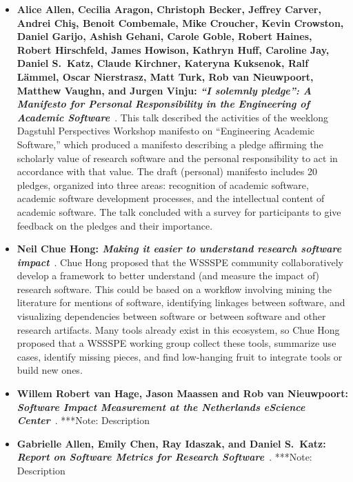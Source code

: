 \documentclass[11pt, oneside]{amsart}
\newcommand{\note}[1]{ {\textcolor{blueish}    { ***Note:      #1 }}}
\begin{document}
\begin{itemize}[itemsep=1ex]
    \item \textbf{Alice Allen, Cecilia Aragon, Christoph Becker, Jeffrey Carver,
    Andrei Chi\c{s}, Benoit Combemale, Mike Croucher, Kevin Crowston, Daniel Garijo,
    Ashish Gehani, Carole Goble\textsuperscript{\textasteriskcentered},
    Robert Haines, Robert Hirschfeld, James Howison,
    Kathryn Huff, Caroline Jay, Daniel S.~Katz, Claude Kirchner, Kateryna Kuksenok,
    Ralf L\"{a}mmel, Oscar Nierstrasz, Matt Turk, Rob van Nieuwpoort, Matthew Vaughn,
    and Jurgen Vinju: \emph{``I solemnly pledge'': A Manifesto for Personal
    Responsibility in the Engineering of Academic Software}}~\cite{AAllen:2016ws}.
    This talk described the activities of the weeklong Dagstuhl Perspectives Workshop
    manifesto on ``Engineering Academic Software,'' which produced a manifesto
    describing a pledge affirming the scholarly value of research software and
    the personal responsibility to act in accordance with that value. The draft
    (personal) manifesto includes 20 pledges, organized into three areas:
    recognition of academic software, academic software development processes,
    and the intellectual content of academic software. The talk concluded with a
    survey for participants to give feedback on the pledges and their importance.

    \item \textbf{Neil Chue Hong\textsuperscript{\textasteriskcentered}:
    \textit{Making it easier to understand research software impact}}~\cite{ChueHong:2016wsb}.
    Chue Hong proposed that the WSSSPE community collaboratively develop a framework
    to better understand (and measure the impact of) research software. This could
    be based on a workflow involving mining the literature for mentions of software,
    identifying linkages between software, and visualizing dependencies between
    software or between software and other research artifacts. Many tools already
    exist in this ecosystem, so Chue Hong proposed that a WSSSPE working group
    collect these tools, summarize use cases, identify missing pieces, and find
    low-hanging fruit to integrate tools or build new ones.

    \item \textbf{Willem Robert van Hage\textsuperscript{\textasteriskcentered},
    Jason Maassen and Rob van Nieuwpoort: \textit{Software Impact Measurement at the
    Netherlands eScience Center}}~\cite{vanHage:2016ws}.
    \note{Description}

    \item \textbf{Gabrielle Allen, Emily Chen\textsuperscript{\textasteriskcentered},
    Ray Idaszak, and Daniel S.\ Katz: \textit{Report on Software Metrics for
    Research Software}}~\cite{GAllen:2016wsb}.
    \note{Description}


\end{itemize}
\end{document}
